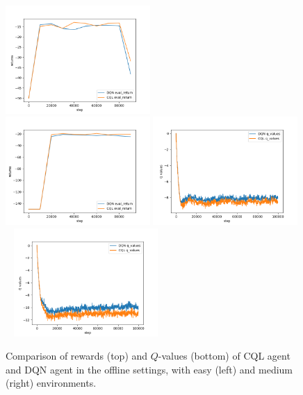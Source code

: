 \documentclass{article}
\begin{document}
\begin{figure}[H]
    \centering
    \includegraphics[width=0.49\textwidth]{../report/assets/4.1-easy.png}~
    \includegraphics[width=0.49\textwidth]{../report/assets/4.1-medium.png}
    \includegraphics[width=0.49\textwidth]{../report/assets/4.1-easy-q.png}~
    \includegraphics[width=0.49\textwidth]{../report/assets/4.1-medium-q.png}
    \caption{Comparison of rewards (top) and $Q$-values (bottom) of CQL agent and DQN agent in the offline settings, with easy (left) and medium (right) environments.}
\end{figure}
\end{document}
